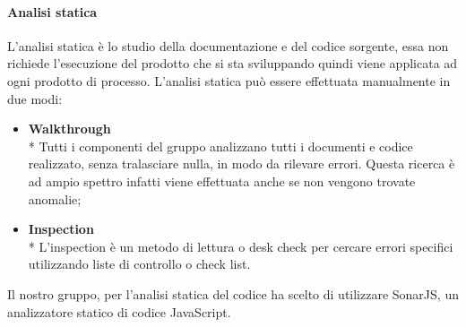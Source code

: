 		\paragraph{Analisi statica}
			L'analisi statica è lo studio della documentazione e del codice sorgente, essa non richiede l'esecuzione del prodotto che si sta sviluppando quindi viene applicata ad ogni prodotto di processo. L'analisi statica può essere effettuata manualmente in due modi:
			\begin{itemize}
				\item \textbf{Walkthrough} \\*
					Tutti i componenti del gruppo analizzano tutti i documenti e codice realizzato, senza tralasciare nulla, in modo da rilevare errori. Questa ricerca è ad ampio spettro infatti viene effettuata anche se non vengono trovate anomalie;
				\item \textbf{Inspection} \\*
					L'inspection è un metodo di lettura o desk check per cercare errori specifici utilizzando liste di controllo o check list.
			\end{itemize}
			Il nostro gruppo, per l'analisi statica del codice ha scelto di utilizzare SonarJS\glo, un analizzatore statico di codice JavaScript. 
